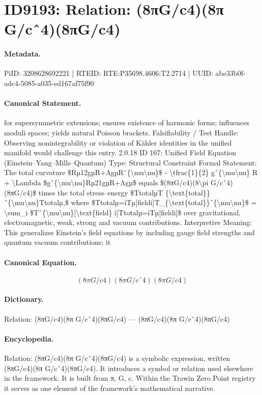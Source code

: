 \section*{ID9193: Relation: (8πG/c4)(8π G/cˆ4)(8πG/c4)}
\paragraph{Metadata.}
PiID: 3208628692221 | RTEID: RTE:P35698.4606:T2.2714 | UUID: abe33b0f-adc4-5085-a035-ed167af75f90

\paragraph{Canonical Statement.}
for supersymmetric extensions; ensures existence of harmonic forms; influences moduli spaces; yields natural Poisson brackets. Falsifiability / Test Handle: Observing nonintegrability or violation of Kähler identities in the unified manifold would challenge this entry. 2.0.18 ID 167: Unified Field Equation (Einstein–Yang–Mills–Quantum) Type: Structural Constraint Formal Statement: The total curvature \$Rµ12gµR+ΛgµRˆ\{\textbackslash{}mu\textbackslash{}nu\}\$ - \textbackslash{}tfrac\{1\}\{2\} gˆ\{\textbackslash{}mu\textbackslash{}nu\} R + \textbackslash{}Lambda \$gˆ\{\textbackslash{}mu\textbackslash{}nu\}Rµ21gµR+Λgµ\$ equals \$(8πG/c4)(8\textbackslash{}pi G/cˆ4)(8πG/c4)\$ times the total stress–energy \$TtotalµT \{\textbackslash{}text\{total\}\}ˆ\{\textbackslash{}mu\textbackslash{}nu\}Ttotalµ,\$ where \$Ttotalµ=iTµ[fieldi]T\_\{\textbackslash{}text\{total\}\}ˆ\{\textbackslash{}mu\textbackslash{}nu\}\$ = \textbackslash{}sum\_i \$Tˆ\{\textbackslash{}mu\textbackslash{}nu\}[\textbackslash{}text\{field\} i]Ttotalµ=iTµ[fieldi]\$ over gravitational, electromagnetic, weak, strong and vacuum contributions. Interpretive Meaning: This generalizes Einstein’s field equations by including gauge field strengths and quantum vacuum contributions; it

\paragraph{Canonical Equation.}
\[
(8πG/c4)(8\pi G/cˆ4)(8πG/c4)
\]

\paragraph{Dictionary.}
Relation: (8πG/c4)(8π G/cˆ4)(8πG/c4) — (8πG/c4)(8π G/cˆ4)(8πG/c4)

\paragraph{Encyclopedia.}
Relation: (8πG/c4)(8π G/cˆ4)(8πG/c4) is a symbolic expression, written (8πG/c4)(8π G/cˆ4)(8πG/c4). It introduces a symbol or relation used elsewhere in the framework. It is built from π, G, c. Within the Trawin Zero Point registry it serves as one element of the framework's mathematical narrative.
